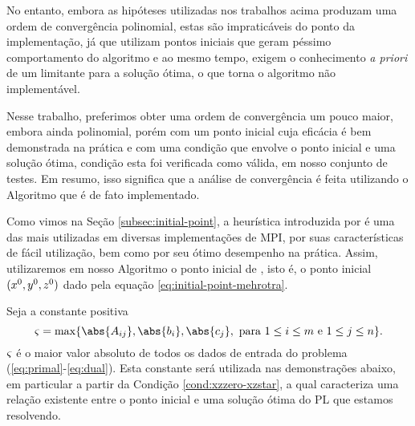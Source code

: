 No entanto, embora as hipóteses  utilizadas nos trabalhos acima produzam uma ordem de convergência  polinomial, estas são impraticáveis do ponto da implementação, já que utilizam pontos iniciais que geram péssimo comportamento do algoritmo e ao mesmo tempo, exigem o conhecimento \emph{a priori}  de um limitante para a solução  ótima, o que torna o algoritmo não implementável. 

Nesse trabalho, preferimos  obter uma ordem de convergência um pouco maior, embora ainda polinomial, porém com um ponto inicial cuja eficácia é bem demonstrada na prática e com uma condição que envolve o ponto inicial e uma solução ótima, condição esta foi verificada como válida, em nosso conjunto de testes. Em resumo, isso significa que a análise de convergência é feita utilizando o Algoritmo que é de fato implementado.


Como vimos na Seção \ref{subsec:initial-point}, a heurística introduzida por \textcite{Mehrotra:1992wr} é uma das mais utilizadas em diversas implementações de \acl{MPI}, por suas características de fácil utilização, bem como por seu  ótimo desempenho na prática.  Assim,  utilizaremos em nosso Algoritmo o ponto inicial de \citeauthor{Mehrotra:1992wr}, isto é, o ponto inicial $(x^0 ,y^0,z^0 )$  dado pela equação \eqref{eq:initial-point-mehrotra}. 



 Seja a constante positiva 
\begin{equation}
	\label{eq:max-norm-data}
 	\bdxzstar = \max\{\abs{A_{ij}},\abs{b_{i}},\abs{c_{j}}, \text{ para } 1\leq i\leq m \text{ e } 1\leq j \leq n  \}.
\end{equation}
$\varsigma$ é o maior valor absoluto de todos os dados de entrada do problema (\ref{eq:primal}-\ref{eq:dual}). Esta constante será utilizada nas demonstrações abaixo, em particular a partir da Condição \ref{cond:xzzero-xzstar}, a qual caracteriza uma relação existente entre  o ponto inicial e uma solução ótima do \ac{PL} que estamos resolvendo. 


